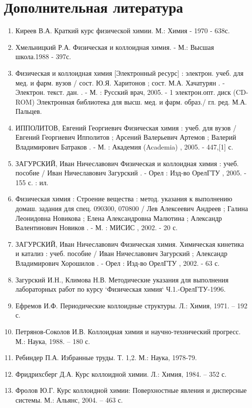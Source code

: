 \section*{Дополнительная литература}
\begin{enumerate}
\item Киреев В.А. Краткий курс физической химии. М.: Химия - 1970 - 638с.
\item Хмельницкий Р.А. Физическая и коллоидная химия. - М.: Высшая школа.1988 - 397с.
\item Физическая и коллоидная химия [Электронный ресурс] : электрон. учеб. для мед. и фарм. вузов / сост. Ю.Я. Харитонов ; сост. М.А. Хачатурян . - Электрон. текст. дан. . - М. : Русский врач, 2005. - 1 электрон.опт. диск (CD-ROM) Электронная библиотека для высш. мед. и фарм. образ./ гл. ред. М.А. Пальцев.
\item ИППОЛИТОВ, Евгений Георгиевич
Физическая химия : учеб. для вузов / Евгений Георгиевич Ипполитов ; Арсений Валерьевич Артемов ; Валерий Владимирович Батраков . - М. : Академия (Academia) , 2005. - 447,[1] с.
\item ЗАГУРСКИЙ, Иван Ничеславович
Физическая и коллоидная химия : учеб. пособие / Иван Ничеславович Загурский . - Орел : Изд-во ОрелГТУ , 2005. - 155 с. : ил.
\item Физическая химия : Строение вещества : метод. указания к выполнению домаш. задания для спец. 090300, 070800 / Лев Алексеевич Андреев ; Галина Леонидовна Новикова ; Елена Александровна Малютина ; Александр Валентинович Новиков . - М. : МИСИС , 2002. - 20 с.
\item ЗАГУРСКИЙ, Иван Ничеславович
Физическая химия. Химическая кинетика и катализ : учеб. пособие / Иван Ничеславович Загурский ; Александр Владимирович Хорошилов . - Орел : Изд-во ОрелГТУ , 2002. - 63 с.
\item Загурский И.Н., Климова Н.В. Методические указания для выполнения лабораторных работ по курсу `Физическая химия` Ч.1.-ОрелГТУ-1996.
\item Ефремов И.Ф. Периодические коллоидные структуры. Л.: Химия, 1971. – 192 с.
\item Петрянов-Соколов И.В. Коллоидная химия и научно-технический прогресс. М.: Наука, 1988. – 180 с.
\item Ребиндер П.А. Избранные труды. Т. 1,2. М.: Наука, 1978-79.
\item Фридрихсберг Д.А. Курс коллоидной химии. Л.: Химия, 1984. – 352 с.
\item Фролов Ю.Г. Курс коллоидной химии: Поверхностные явления и дисперсные системы. М.: Альянс, 2004. – 463 с.
\end{enumerate}